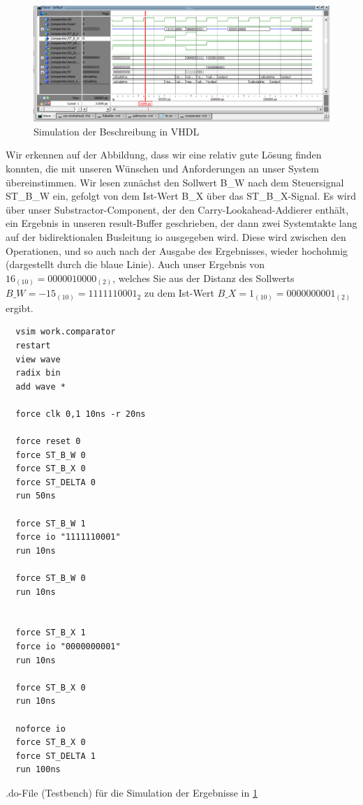 \documentclass{report}
\newenvironment{longlisting}{\captionsetup{type=listing}}{}
\begin{document}
\begin{figure}[h]
  \centering
  \includegraphics[width=\textwidth]{../assets/images/DIHA/simuB.png}
  \caption{Simulation der Beschreibung in VHDL}
  \label{fig:simuB}
\end{figure}

Wir erkennen auf der Abbildung, dass wir eine relativ gute Lösung finden konnten, die mit unseren Wünschen und Anforderungen an unser System übereinstimmen. Wir lesen zunächst den Sollwert B\_W nach dem Steuersignal ST\_B\_W ein, gefolgt von dem Ist-Wert B\_X über das ST\_B\_X-Signal. Es wird über unser Substractor-Component, der den Carry-Lookahead-Addierer enthält, ein Ergebnis in unseren result-Buffer geschrieben, der dann zwei Systemtakte lang auf der bidirektionalen Busleitung io ausgegeben wird. Diese wird zwischen den Operationen, und so auch nach der Ausgabe des Ergebnisses, wieder hochohmig (dargestellt durch die blaue Linie). Auch unser Ergebnis von $16_{(10)} = 0000010000_{(2)}$, welches Sie aus der Distanz des Sollwerts $B\_W = -15_{(10)} = 1111110001_{2}$ zu dem Ist-Wert $B\_X = 1_{(10)} = 0000000001_{(2)}$ ergibt.

\newpage 

\begin{longlisting}
  \begin{verbatim}
  vsim work.comparator
  restart
  view wave
  radix bin
  add wave *

  force clk 0,1 10ns -r 20ns

  force reset 0
  force ST_B_W 0
  force ST_B_X 0
  force ST_DELTA 0
  run 50ns

  force ST_B_W 1
  force io "1111110001"
  run 10ns

  force ST_B_W 0
  run 10ns


  force ST_B_X 1
  force io "0000000001"
  run 10ns

  force ST_B_X 0
  run 10ns

  noforce io
  force ST_B_X 0
  force ST_DELTA 1
  run 100ns
  \end{verbatim}
  \caption{.do-File (Testbench) für die Simulation der Ergebnisse in \ref{fig:simuB}}
  \label{code:doB}
\end{longlisting}
\end{document}
